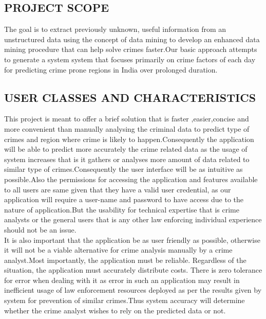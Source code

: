 \documentclass[12pt]{extreport}
\begin{document}
     \subsection{PROJECT SCOPE}
\hspace*{5em}The goal is to extract previously unknown, useful information from an unstructured data using the concept of data mining to develop an enhanced data mining procedure that  can help solve crimes faster.Our basic approach attempts to generate a system system that focuses primarily on crime factors of each day for predicting crime prone regions in India over prolonged duration.
     \subsection{USER CLASSES AND CHARACTERISTICS}
\hspace*{5em}This project is meant to offer a brief solution that is faster ,easier,concise and more convenient  than manually analysing the criminal data to predict type of crimes and region where crime is likely to happen.Consequently the application will be able to predict more accurately the crime related data as the usage of system increases that is it gathers or analyses more amount of data related to similar type of crimes.Consequently the user interface will be as intuitive as possible.Also the permissions for accessing the application and features available to all users are same given that they have a valid user credential, as our application will require a user-name and password   to have access due to the nature of application.But the usability for technical expertise that is crime analysts or the general users that is any other law enforcing individual  experience should not be an issue.\\

It is also important that the application be as user friendly as possible, otherwise it will not be a viable alternative for crime analysis 	manually by a crime analyst.Most importantly, the application must be reliable. Regardless of the situation, the application must accurately distribute costs. There is zero tolerance for error when dealing with it as error in such an application may result in inefficient usage of law enforcement resources deployed as per the results given by system for prevention of similar crimes.Thus system accuracy will determine whether the crime analyst wishes to rely on the predicted data or not.
\end{document}
